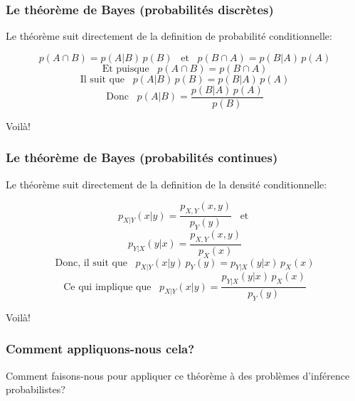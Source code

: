 \documentclass{beamer}
\begin{document}

\begin{frame}
    \frametitle{Le théorème de Bayes (probabilités discrètes)}
    Le théorème suit directement de la definition de probabilité conditionnelle:

    \[p(A \cap B) =  p(A | B) \, p(B) \,\,\, \textrm{ et } \,\,\, p(B \cap A) =  p(B | A) \, p(A)\]
    \[\textrm{Et puisque } \,\,\, p(A \cap B) = p(B \cap A)\]
    \[\textrm{Il suit que } \,\,\, p(A | B) \, p(B) = p(B | A) \, p(A)\]
    \[\textrm{Donc } \,\,\, p(A | B) = \frac{p(B | A) \, p(A)}{p(B)}\]
    
    Voilà!
\end{frame}


\begin{frame}
    \frametitle{Le théorème de Bayes (probabilités continues)}
    Le théorème suit directement de la definition de la densité conditionnelle:

    \[p_{X|Y}(x|y) = \frac{p_{X,Y}(x,y)}{p_Y(y)} \,\,\, \textrm{ et }\]
    \[p_{Y|X}(y|x) = \frac{p_{X,Y}(x,y)}{p_X(x)}\]
    \[\textrm{Donc, il suit que } \,\,\, p_{X|Y}(x|y) \, p_Y(y) = p_{Y|X}(y|x) \, p_X(x)\]
    \[\textrm{Ce qui implique que } \,\,\, p_{X|Y}(x|y) = \frac{p_{Y|X}(y|x) \, p_X(x)}{p_Y(y)}\]

    Voilà!
\end{frame}


\begin{frame}
    \frametitle{Comment appliquons-nous cela?}
    Comment faisons-nous pour appliquer ce théorème à des problèmes 
    d'inférence probabilistes?

    \vfill

\end{frame}



\end{document}
